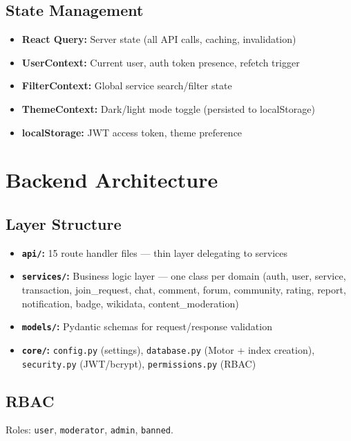 \documentclass[10pt,a4paper]{report}
\begin{document}
\subsection{State Management}

\begin{itemize}
    \item \textbf{React Query:} Server state (all API calls, caching, invalidation)
    \item \textbf{UserContext:} Current user, auth token presence, refetch trigger
    \item \textbf{FilterContext:} Global service search/filter state
    \item \textbf{ThemeContext:} Dark/light mode toggle (persisted to localStorage)
    \item \textbf{localStorage:} JWT access token, theme preference
\end{itemize}

\section{Backend Architecture}

\subsection{Layer Structure}

\begin{itemize}
    \item \textbf{\texttt{api/}:} 15 route handler files --- thin layer delegating to services
    \item \textbf{\texttt{services/}:} Business logic layer --- one class per domain (auth, user, service, transaction, join\_request, chat, comment, forum, community, rating, report, notification, badge, wikidata, content\_moderation)
    \item \textbf{\texttt{models/}:} Pydantic schemas for request/response validation
    \item \textbf{\texttt{core/}:} \texttt{config.py} (settings), \texttt{database.py} (Motor + index creation), \texttt{security.py} (JWT/bcrypt), \texttt{permissions.py} (RBAC)
\end{itemize}

\subsection{RBAC}

Roles: \texttt{user}, \texttt{moderator}, \texttt{admin}, \texttt{banned}.
\end{document}
